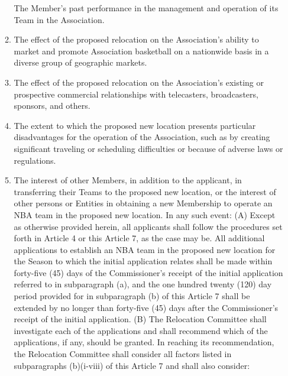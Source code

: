 \documentclass[]{book}
\begin{document}
\begin{enumerate}
\begin{enumerate}
    The Member's past performance in the management and operation of its Team in the Association.
  \item
    The effect of the proposed relocation on the Association's ability to market and promote Association basketball on a nationwide basis in a diverse group of geographic markets.
  \item
    The effect of the proposed relocation on the Association's existing or prospective commercial relationships with telecasters, broadcasters, sponsors, and others.
  \item
    The extent to which the proposed new location presents particular disadvantages for the operation of the Association, such as by creating significant traveling or scheduling difficulties or because of adverse laws or regulations.
  \item
    The interest of other Members, in addition to the applicant, in transferring their Teams to the proposed new location, or the interest of other persons or Entities in obtaining a new Membership to operate an NBA team in the proposed new location. In any such event:
    (A) Except as otherwise provided herein, all applicants shall follow the procedures set forth in Article 4 or this Article 7, as the case may be. All additional applications to establish an NBA team in the proposed new location for the Season to which the initial application relates shall be made within forty-five (45) days of the Commissioner's receipt of the initial application referred to in subparagraph (a), and the one hundred twenty (120) day period provided for in subparagraph (b) of this Article 7 shall be extended by no longer than forty-five (45) days after the Commissioner's receipt of the initial application.
    (B) The Relocation Committee shall investigate each of the applications and shall recommend which of the applications, if any, should be granted. In reaching its recommendation, the Relocation Committee shall consider all factors listed in subparagraphs (b)(i-viii) of this Article 7 and shall also consider:


\end{enumerate}
\end{enumerate}
\end{document}
